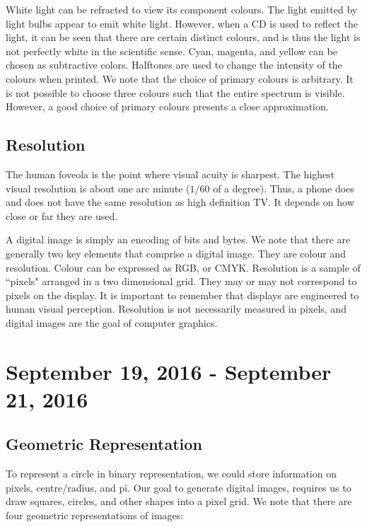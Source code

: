 \documentclass[11pt]{article}
\theoremstyle{plain} %
\theoremstyle{definition}
\theoremstyle{example}
\theoremstyle{remark}
\begin{document}
White light can be refracted to view its component colours. The light emitted by light bulbs appear to emit white light. However, when a CD is used to reflect the light, it can be seen that there are certain distinct colours, and is thus the light is not perfectly white in the scientific sense. Cyan, magenta, and yellow can be chosen as subtractive colors. Halftones are used to change the intensity of the colours when printed. We note that the choice of primary colours is arbitrary. It is not possible to choose three colours such that the entire spectrum is visible. However, a good choice of primary colours presents a close approximation.

\subsection{Resolution}

The human foveola is the point where visual acuity is sharpest. The highest visual resolution is about one arc minute ($1/60$ of a degree). Thus, a phone does and does not have the same resolution as high definition TV. It depends on how close or far they are used. 

A digital image is simply an encoding of bits and bytes. We note that there are generally two key elements that comprise a digital image. They are colour and resolution. Colour can be expressed as RGB, or CMYK. Resolution is a sample of ``pixels" arranged in a two dimensional grid. They may or may not correspond to pixels on the display. It is important to remember that displays are engineered to human visual perception. Resolution is not necessarily measured in pixels, and digital images are the goal of computer graphics. 

\section{September 19, 2016 - September 21, 2016}
\subsection{Geometric Representation}

To represent a circle in binary representation, we could store information on pixels, centre/radius, and pi. Our goal to generate digital images, requires us to draw squares, circles, and other shapes into a pixel grid. We note that there are four geometric representations of images:
\end{document}
